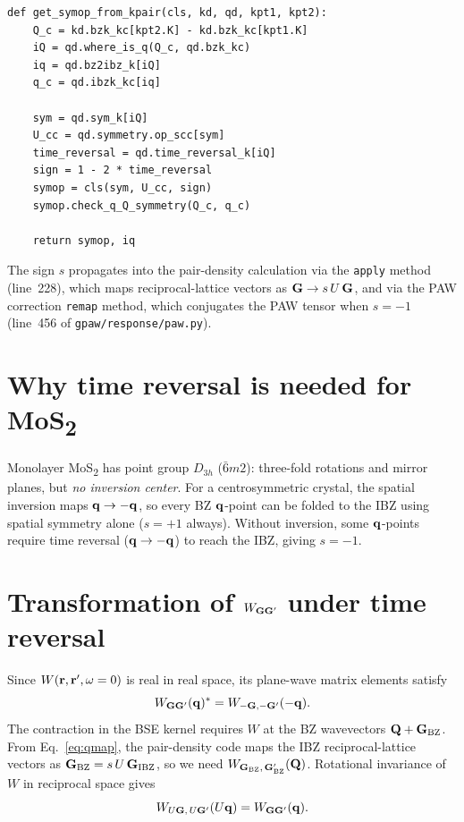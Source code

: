 \documentclass[11pt,a4paper]{article}
\begin{document}
\begin{lstlisting}[style=python,firstnumber=263,
  caption={\texttt{gpaw/response/g0w0.py}: Determination of the
           symmetry operation mapping $\vb{Q}$ to $\vb{q}_\text{IBZ}$.}]
def get_symop_from_kpair(cls, kd, qd, kpt1, kpt2):
    Q_c = kd.bzk_kc[kpt2.K] - kd.bzk_kc[kpt1.K]
    iQ = qd.where_is_q(Q_c, qd.bzk_kc)
    iq = qd.bz2ibz_k[iQ]
    q_c = qd.ibzk_kc[iq]

    sym = qd.sym_k[iQ]
    U_cc = qd.symmetry.op_scc[sym]
    time_reversal = qd.time_reversal_k[iQ]
    sign = 1 - 2 * time_reversal
    symop = cls(sym, U_cc, sign)
    symop.check_q_Q_symmetry(Q_c, q_c)

    return symop, iq
\end{lstlisting}

The sign $s$ propagates into the pair-density calculation via the
\texttt{apply} method (line~228), which maps reciprocal-lattice vectors
as $\vb{G} \to s\,U\,\vb{G}$, and via the PAW correction
\texttt{remap} method, which conjugates the PAW tensor when $s = -1$
(line~456 of \texttt{gpaw/response/paw.py}).

\section{Why time reversal is needed for MoS\textsubscript{2}}

Monolayer MoS\textsubscript{2} has point group $D_{3h}$
($\bar{6}m2$): three-fold rotations and mirror planes, but
\emph{no inversion center}.  For a centrosymmetric crystal, the
spatial inversion maps $\vb{q} \to -\vb{q}$, so every BZ
$\vb{q}$-point can be folded to the IBZ using spatial symmetry alone
($s = +1$ always).  Without inversion, some $\vb{q}$-points require
time reversal ($\vb{q} \to -\vb{q}$) to reach the IBZ, giving
$s = -1$.

\section{Transformation of $W_{\vb{GG}'}$ under time reversal}

Since $W(\vb{r}, \vb{r}', \omega = 0)$ is real in real space, its
plane-wave matrix elements satisfy
\begin{equation}\label{eq:reality}
  W_{\vb{GG}'}(\vb{q})^*
  = W_{-\vb{G},-\vb{G}'}(-\vb{q}).
\end{equation}
The contraction in the BSE kernel requires $W$ at the BZ wavevectors
$\vb{Q} + \vb{G}_\text{BZ}$.  From Eq.~\eqref{eq:qmap}, the
pair-density code maps the IBZ reciprocal-lattice vectors as
$\vb{G}_\text{BZ} = s\,U\,\vb{G}_\text{IBZ}$, so we need
$W_{\vb{G}_\text{BZ},\,\vb{G}_\text{BZ}'}(\vb{Q})$.
Rotational invariance of $W$ in reciprocal space gives
\begin{equation}\label{eq:rotation}
  W_{U\vb{G},\,U\vb{G}'}(U\vb{q})
  = W_{\vb{GG}'}(\vb{q}).
\end{equation}
\end{document}

